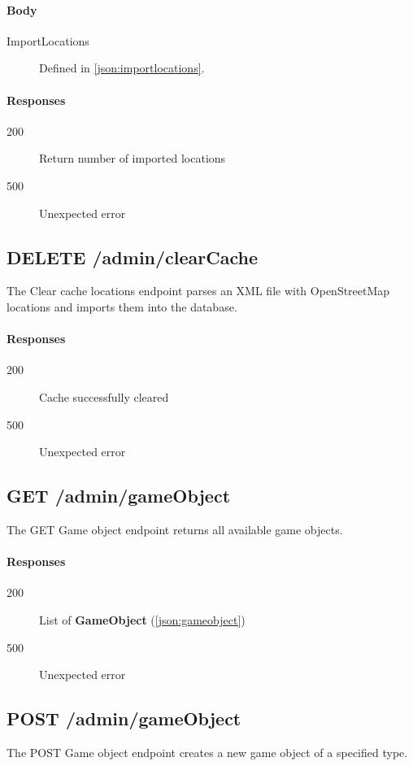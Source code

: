 		\paragraph*{Body}
			\begin{description}
				\item[ImportLocations] Defined in \ref{json:importlocations}.
			\end{description}
		\paragraph*{Responses}
			\begin{description}		
				\item[200] Return number of imported locations
				\item[500] Unexpected error
			\end{description}
		
	\subsection{DELETE /admin/clearCache}
	The Clear cache locations endpoint parses an XML file with OpenStreetMap locations and imports them into the database.
		\paragraph*{Responses}
			\begin{description}		
				\item[200] Cache successfully cleared
				\item[500] Unexpected error
			\end{description}
			
	\subsection{GET /admin/gameObject}
	The GET Game object endpoint returns all available game objects.
		\paragraph*{Responses}
			\begin{description}		
				\item[200] List of \textbf{GameObject} (\ref{json:gameobject})
				\item[500] Unexpected error
			\end{description}
			
	\subsection{POST /admin/gameObject}
	The POST Game object endpoint creates a new game object of a specified type.
